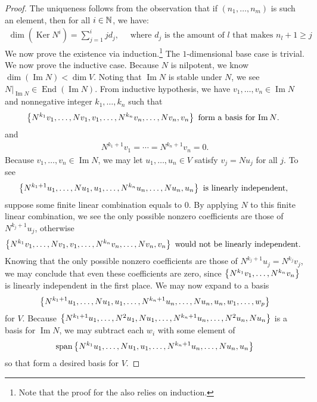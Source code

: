 \documentclass{report}
\begin{document}
\begin{proof}
The uniqueness follows from the observation that if $(n_1,\dots ,n_m)$ is such an element, then for all $i\in\mathbb{N}$, we have: 
 \begin{align*}
\operatorname{dim}\left(\operatorname{Ker} N^i \right) = \sum_{j=1}^i j d_j,\quad \text{ where }d_j\text{ is the amount of $l$ that makes } n_l+1\geq j
\end{align*}
We now prove the existence via induction.\footnote{Note that the proof for the  also relies on induction.} The $1$-dimensional base case is trivial. We now prove the inductive case.  Because $N$ is nilpotent, we know  $\operatorname{dim}(\operatorname{Im}N)< \operatorname{dim}V$. Noting that $\operatorname{Im}N$ is stable under $N$, we see $N|_{\operatorname{Im}N}\in \operatorname{End}(\operatorname{Im}N)$. From inductive hypothesis, we have $v_1,\dots ,v_n\in \operatorname{Im}N$ and nonnegative integer $k_1,\dots ,k_n$ such that 
\begin{align*}
  \left\{ N^{k_1}v_1,\dots ,Nv_1,v_1, \dots ,N^{k_n}v_n,\dots ,Nv_n,v_n \right\}\text{ form a basis for $\operatorname{Im}N$. }
\end{align*}
and 
\begin{align*}
N^{k_1+1}v_1=\cdots = N^{k_n+1}v_n=0. 
\end{align*}
Because $v_1,\dots ,v_n \in \operatorname{Im}N$, we may let $u_1,\dots ,u_n \in V$ satisfy $v_j=Nu_j$ for all  $j$. To see 
\begin{align}
\label{setn}
  \left\{ N^{k_1+1}u_1 ,\dots ,Nu_1,u_1, \dots ,N^{k_n}u_n,\dots ,Nu_n,u_n \right\}\text{ is linearly independent, }
\end{align}
suppose some finite linear combination equals to $0$. By applying $N$ to this finite linear combination, we see the only possible nonzero coefficients are those of $N^{k_j+1}u_j$, otherwise 
\begin{align*}
  \left\{ N^{k_1}v_1,\dots ,Nv_1,v_1,\dots ,N^{k_n}v_n,\dots ,Nv_n,v_n \right\}\text{ would not be linearly independent. }
\end{align*}
Knowing that the only possible nonzero coefficients are those of $N^{k_j+1}u_j=N^{k_j}v_j$, we may conclude that even these coefficients are zero, since $\left\{ N^{k_1}v_1,\dots ,N^{k_n}v_n \right\}$ is linearly independent in the first place. We may now expand  to a basis 
\begin{align}
\label{set1}
\left\{ N^{k_1+1}u_1,\dots ,Nu_1,u_1,\dots ,N^{k_n+1}u_n,\dots ,Nu_n,u_n,w_1,\dots ,w_p \right\}
\end{align}
for $V$. Because $\left\{ N^{k_1+1}u_1,\dots ,N^2u_1,Nu_1,\dots ,N^{k_n+1}u_n,\dots ,N^2u_n,Nu_n \right\}$ is a basis for  $\operatorname{Im}N$, we may subtract each $w_i$ with some element of 
\begin{align*}
\operatorname{span} \left\{ N^{k_1}u_1,\dots ,Nu_1,u_1,\dots , N^{k_n+1}u_n,\dots ,Nu_n,u_n \right\}
\end{align*}
so that   form a desired basis for $V$.    
\end{proof}
\end{document}
